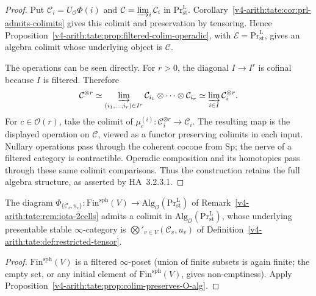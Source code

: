 \begin{proof}
Put \(\mathcal C_i=U_{\mathcal O}\Phi(i)\) and
\(\mathcal C=\varinjlim_i\mathcal C_i\) in
\(\mathrm{Pr}^{\mathrm L}_{\mathrm{st}}\).
Corollary~\ref{v4-arith:tate:cor:prl-admits-colimits} gives
this colimit and preservation by tensoring. Hence
Proposition~\ref{v4-arith:tate:prop:filtered-colim-operadic},
with \(\mathcal E=\mathrm{Pr}^{\mathrm L}_{\mathrm{st}}\), gives
an algebra colimit whose underlying object is \(\mathcal C\).

The operations can be seen directly. For \(r>0\), the diagonal
\(I\to I^r\) is cofinal because \(I\) is filtered. Therefore
\[
 \mathcal C^{\otimes r}
 \simeq\varinjlim_{(i_1,\ldots,i_r)\in I^r}
       \mathcal C_{i_1}\otimes\cdots\otimes\mathcal C_{i_r}
 \simeq\varinjlim_{i\in I}\mathcal C_i^{\otimes r}.
\]
For \(c\in\mathcal O(r)\), take the colimit of
\(\mu_c^{(i)}:\mathcal C_i^{\otimes r}\to\mathcal C_i\).
The resulting map is the displayed operation on \(\mathcal C\),
viewed as a functor preserving colimits in each input.
Nullary operations pass through the coherent cocone from
\(\mathrm{Sp}\); the nerve of a filtered category is contractible.
Operadic composition and its homotopies pass through these same
colimit comparisons. Thus the construction retains the full
algebra structure, as asserted by HA~3.2.3.1.
\end{proof}

\begin{corollary}
\label{v4-arith:tate:cor:rtp-as-colimit-in-alg}
\ClaimStatusProvedHere The diagram
\(\Phi_{\{\mathcal{C}_{v},u_{v}\}}:\mathrm{Fin}^{\mathrm{sph}}(V)\to\mathrm{Alg}_{\mathcal{O}}(\mathrm{Pr}^{\mathrm{L}}_{\mathrm{st}})\)
of
Remark~\ref{v4-arith:tate:rem:iota-2cells} admits a colimit in
\(\mathrm{Alg}_{\mathcal{O}}(\mathrm{Pr}^{\mathrm{L}}_{\mathrm{st}})\),
whose underlying presentable stable \(\infty\)-category is
\(\bigotimes'_{v\in V}(\mathcal{C}_{v},u_{v})\) of
Definition~\ref{v4-arith:tate:def:restricted-tensor}.
\end{corollary}

\begin{proof}
\(\mathrm{Fin}^{\mathrm{sph}}(V)\) is a filtered \(\infty\)-poset
(union of finite subsets is again finite; the empty set, or any
initial element of \(\mathrm{Fin}^{\mathrm{sph}}(V)\), gives
non-emptiness). Apply
Proposition~\ref{v4-arith:tate:prop:colim-preserves-O-alg}.
\end{proof}

